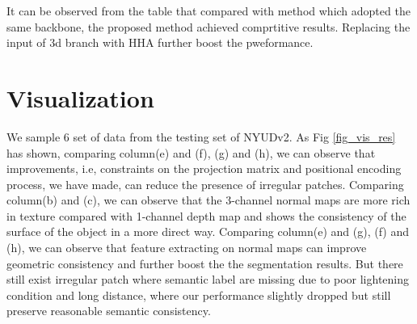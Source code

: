 \documentclass[journal]{IEEEtran}
\begin{document}
    It can be observed from the table that compared with method which adopted the same backbone, the proposed method achieved comprtitive results. Replacing the input of 3d branch with HHA further boost the pweformance.
    

    \section{Visualization}
    We sample 6 set of data from the testing set of NYUDv2. As Fig \ref{fig_vis_res}
    has shown, comparing column(e) and (f), (g) and (h), we can observe that improvements, i.e, constraints on the projection matrix and positional
    encoding process, we have made, can reduce the presence of irregular patches. Comparing column(b) and (c), we can observe that the 3-channel normal maps are more rich in texture compared with 1-channel depth map and shows the consistency of the surface of the object in a more direct way. Comparing column(e) and (g), (f) and (h), we can observe that feature extracting on normal maps can improve geometric consistency and further boost the the segmentation results. But there still exist irregular patch where semantic label are missing due to poor lightening condition and long distance, where our performance slightly dropped but still preserve reasonable semantic consistency.
\end{document}
